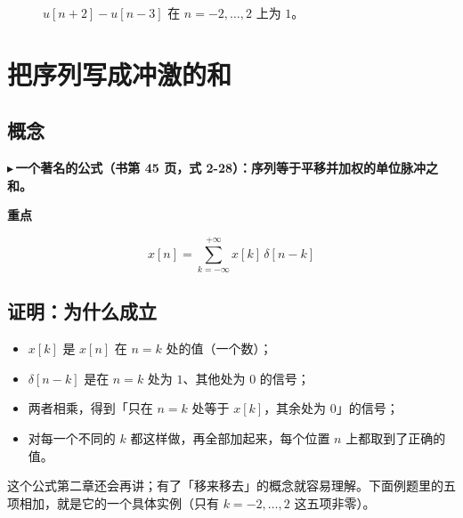 \documentclass[UTF8,a4paper,11pt]{ctexart}
\newenvironment{remember}{\begin{rememberbox}\textbf{重点}\par\smallskip}{\end{rememberbox}}
\newcommand{\stem}[2]{\draw[thick,blue!70!black] (#1,0) -- (#1,#2); \fill[blue!70!black] (#1,#2) circle (1.8pt);}
\newcommand{\stemzero}[1]{\fill[blue!70!black] (#1,0) circle (1.4pt);}
\newcounter{ex}[section]
\newcommand{\point}[1]{\par\addvspace{1ex}\noindent\textcolor{ptteal}{$\blacktriangleright$\,\textbf{#1}}\ }
\renewcommand{\paragraph}[1]{\point{#1}}
\begin{document}
\begin{figure}[H]
\centering
{}
\caption{$u[n+2]-u[n-3]$ 在 $n=-2,\dots,2$ 上为 $1$。}
\end{figure}

\section{把序列写成冲激的和}\label{sec:delta}
\subsection{概念}
\paragraph{一个著名的公式（书第 45 页，式 2-28）：序列等于平移并加权的单位脉冲之和。}
\begin{remember}
\[
x[n]=\sum_{k=-\infty}^{+\infty}x[k]\,\delta[n-k]
\]
\end{remember}


\subsection{证明：为什么成立}
\begin{itemize}[nosep]
\item $x[k]$ 是 $x[n]$ 在 $n=k$ 处的值（一个数）；
\item $\delta[n-k]$ 是在 $n=k$ 处为 $1$、其他处为 $0$ 的信号；
\item 两者相乘，得到「只在 $n=k$ 处等于 $x[k]$，其余处为 $0$」的信号；
\item 对每一个不同的 $k$ 都这样做，再全部加起来，每个位置 $n$ 上都取到了正确的值。
\end{itemize}
这个公式第二章还会再讲；有了「移来移去」的概念就容易理解。下面例题里的五项相加，就是它的一个具体实例（只有 $k=-2,\dots,2$ 这五项非零）。
\end{document}
